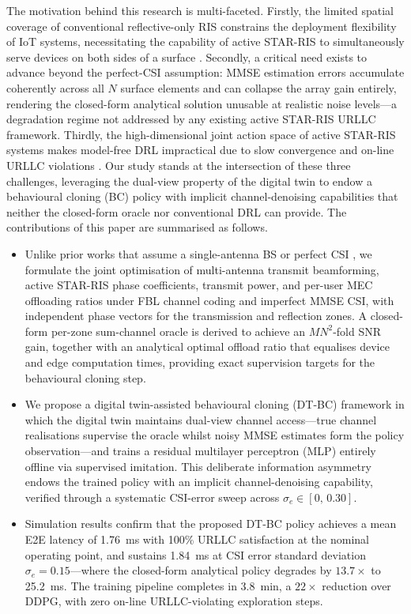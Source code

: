 \documentclass[journal]{IEEEtran}
\begin{document}
The motivation behind this research is multi-faceted. Firstly, the
limited spatial coverage of conventional reflective-only RIS
constrains the deployment flexibility of IoT systems, necessitating
the capability of active STAR-RIS to simultaneously serve devices on
both sides of a surface \cite{liu2021star,mu2022star}. Secondly, a
critical need exists to advance beyond the perfect-CSI assumption:
MMSE estimation errors accumulate coherently across all $N$ surface
elements and can collapse the array gain entirely, rendering the
closed-form analytical solution unusable at realistic noise levels---a
degradation regime not addressed by any existing active STAR-RIS URLLC
framework. Thirdly, the high-dimensional joint action space of active
STAR-RIS systems makes model-free DRL impractical due to slow
convergence and on-line URLLC violations \cite{zappone2019model}. Our
study stands at the intersection of these three challenges, leveraging
the dual-view property of the digital twin to endow a behavioural
cloning (BC) policy with implicit channel-denoising capabilities that
neither the closed-form oracle nor conventional DRL can provide. The
contributions of this paper are summarised as follows.
\begin{itemize}
\item Unlike prior works that assume a single-antenna BS or perfect
CSI \cite{paul2024active,ren2020joint}, we formulate the joint
optimisation of multi-antenna transmit beamforming, active STAR-RIS
phase coefficients, transmit power, and per-user MEC offloading ratios
under FBL channel coding and imperfect MMSE CSI, with independent
phase vectors for the transmission and reflection zones. A closed-form
per-zone sum-channel oracle is derived to achieve an $MN^2$-fold SNR
gain, together with an analytical optimal offload ratio that equalises
device and edge computation times, providing exact supervision targets
for the behavioural cloning step.

\item We propose a digital twin-assisted behavioural cloning (DT-BC)
framework in which the digital twin maintains dual-view channel
access---true channel realisations supervise the oracle whilst noisy
MMSE estimates form the policy observation---and trains a residual
multilayer perceptron (MLP) entirely offline via supervised imitation.
This deliberate information asymmetry endows the trained policy with
an implicit channel-denoising capability, verified through a
systematic CSI-error sweep across $\sigma_e \in [0,\,0.30]$.

\item Simulation results confirm that the proposed DT-BC policy
achieves a mean E2E latency of 1.76~ms with 100\% URLLC satisfaction
at the nominal operating point, and sustains 1.84~ms at CSI error
standard deviation $\sigma_e\!=\!0.15$---where the closed-form
analytical policy degrades by $13.7\times$ to 25.2~ms. The training
pipeline completes in 3.8~min, a $22\times$ reduction over DDPG,
with zero on-line URLLC-violating exploration steps.
\end{itemize}
\end{document}
